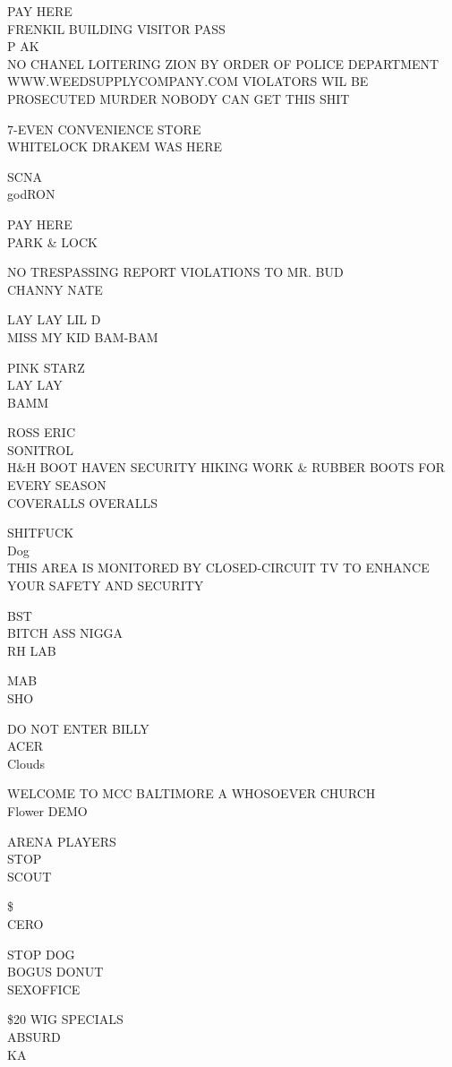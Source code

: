 \documentclass[10pt,letterpaper]{article}
\begin{document}
PAY HERE\\
FRENKIL BUILDING VISITOR PASS\\
P AK\\
NO CHANEL LOITERING ZION BY ORDER OF POLICE DEPARTMENT WWW.WEEDSUPPLYCOMPANY.COM VIOLATORS WIL BE PROSECUTED MURDER NOBODY CAN GET THIS SHIT

7{-}EVEN CONVENIENCE STORE\\
WHITELOCK DRAKEM WAS HERE

SCNA\\
godRON

PAY HERE\\
PARK \& LOCK

NO TRESPASSING REPORT VIOLATIONS TO MR. BUD\\
CHANNY NATE

LAY LAY LIL D\\
MISS MY KID BAM{-}BAM

PINK STARZ\\
LAY LAY\\
BAMM

ROSS ERIC\\
SONITROL\\
H\&H BOOT HAVEN SECURITY HIKING WORK \& RUBBER BOOTS FOR EVERY SEASON\\
COVERALLS OVERALLS

SHITFUCK\\
Dog\\
THIS AREA IS MONITORED BY CLOSED{-}CIRCUIT TV TO ENHANCE YOUR SAFETY AND SECURITY

BST\\
BITCH ASS NIGGA\\
RH LAB

MAB\\
SHO

DO NOT ENTER BILLY\\
ACER\\
Clouds

WELCOME TO MCC BALTIMORE A WHOSOEVER CHURCH\\
Flower DEMO

ARENA PLAYERS\\
STOP\\
SCOUT

\$\\
CERO

STOP DOG\\
BOGUS DONUT\\
SEXOFFICE

\$20 WIG SPECIALS\\
ABSURD\\
KA
\end{document}
